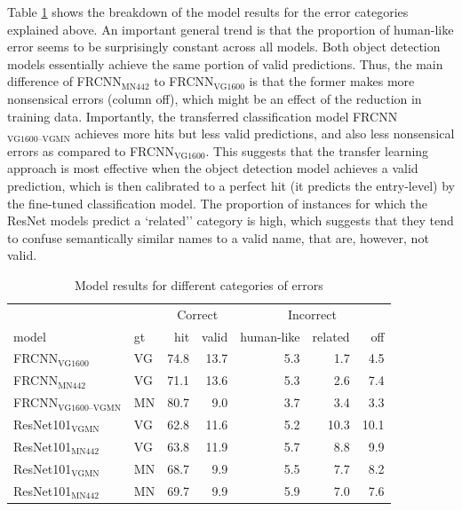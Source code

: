Table \ref{tab:humanlike} shows the breakdown of the model results for the error categories explained above. An important general trend is that the proportion of human-like error seems to be surprisingly constant across all models. 
Both object detection models essentially achieve the same portion of valid predictions. Thus, the main difference of FRCNN$_{\text{MN442}}$ to  FRCNN$_{\text{VG1600}}$ is that the former makes more nonsensical errors (column off), which might be an effect of the reduction in training data.
Importantly, the transferred classification model FRCNN$_{\text{VG1600--VGMN}}$ achieves more hits but less valid predictions, and also less nonsensical errors as compared to FRCNN$_{\text{VG1600}}$.
This suggests that the transfer learning approach is most effective when the object detection model achieves a valid prediction, which is then calibrated to a perfect hit (it predicts the entry-level) by the fine-tuned classification model.
The proportion of instances for which the ResNet models predict a `related'' category is high, which suggests that they tend to confuse semantically similar names to a valid name, that are, however, not valid. 

\begin{table}[t]
\centering
	\small
\begin{tabular}{ll||rr|rrr}
\toprule
&  & \multicolumn{2}{c|}{Correct} & \multicolumn{3}{c}{Incorrect}\\
                         model &  gt &  hit &  valid &  human-like &  related &  off \\
\midrule
       FRCNN$_{\text{VG1600}}$ &  VG & 74.8 &     13.7 &         5.3 &      1.7 &    4.5 \\
        FRCNN$_{\text{MN442}}$ &  VG & 71.1 &     13.6 &         5.3 &      2.6 &    7.4 \\
        \midrule
 FRCNN$_{\text{VG1600--VGMN}}$ &  MN & 80.7 &      9.0 &         3.7 &      3.4 &    3.3 \\
         \midrule
     ResNet101$_{\text{VGMN}}$ &  VG & 62.8 &     11.6 &         5.2 &     10.3 &   10.1 \\
         ResNet101$_{\text{MN442}}$ &  VG & 63.8 &     11.9 &         5.7 &      8.8 &    9.9 \\
     ResNet101$_{\text{VGMN}}$ &  MN & 68.7 &      9.9 &         5.5 &      7.7 &    8.2 \\
    ResNet101$_{\text{MN442}}$ &  MN & 69.7 &      9.9 &         5.9 &      7.0 &    7.6 \\
\bottomrule
\end{tabular}

\caption{Model results for different categories of errors} \label{tab:humanlike}
\end{table}

